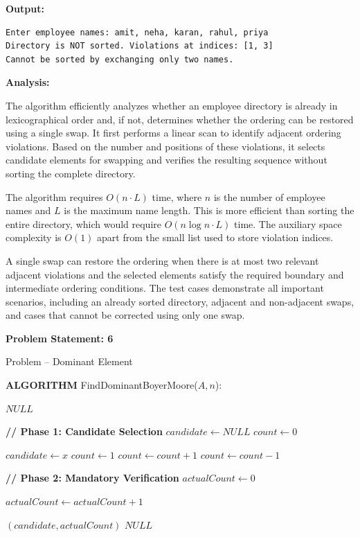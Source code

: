 \documentclass[12pt]{article}
\begin{document}
\textbf{Output:}
\begin{lstlisting}[style=output]
Enter employee names: amit, neha, karan, rahul, priya
Directory is NOT sorted. Violations at indices: [1, 3]
Cannot be sorted by exchanging only two names.
\end{lstlisting}

\textbf{Analysis:}

The algorithm efficiently analyzes whether an employee directory is already in lexicographical order and, if not, determines whether the ordering can be restored using a single swap. It first performs a linear scan to identify adjacent ordering violations. Based on the number and positions of these violations, it selects candidate elements for swapping and verifies the resulting sequence without sorting the complete directory.

The algorithm requires $O(n \cdot L)$ time, where $n$ is the number of employee names and $L$ is the maximum name length. This is more efficient than sorting the entire directory, which would require $O(n \log n \cdot L)$ time. The auxiliary space complexity is $O(1)$ apart from the small list used to store violation indices.

A single swap can restore the ordering when there is at most two relevant adjacent violations and the selected elements satisfy the required boundary and intermediate ordering conditions. The test cases demonstrate all important scenarios, including an already sorted directory, adjacent and non-adjacent swaps, and cases that cannot be corrected using only one swap.

\newpage

\textbf{Problem Statement: 6}

Problem – Dominant Element


\begin{algorithm}[H]
\caption{FindDominantBoyerMoore}
\begin{algorithmic}[1]

\State \textbf{ALGORITHM} FindDominantBoyerMoore($A, n$):

    \State \Return $NULL$
\EndIf

\State \textbf{// Phase 1: Candidate Selection}
\State $candidate \gets NULL$
\State $count \gets 0$

        \State $candidate \gets x$
        \State $count \gets 1$
        \State $count \gets count + 1$
    \Else
        \State $count \gets count - 1$
    \EndIf
\EndFor

\State \textbf{// Phase 2: Mandatory Verification}
\State $actualCount \gets 0$

        \State $actualCount \gets actualCount + 1$
    \EndIf
\EndFor

    \State \Return $(candidate, actualCount)$
\Else
    \State \Return $NULL$
\EndIf

\end{algorithmic}
\end{algorithm}
\end{document}
